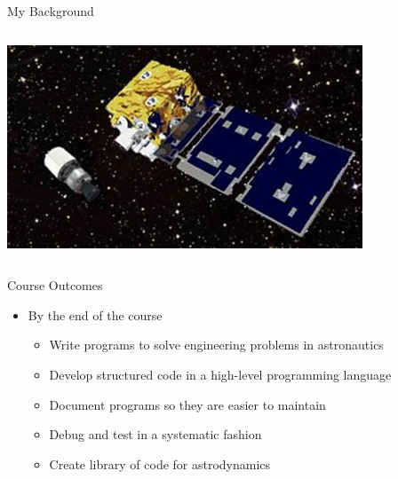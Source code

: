 \documentclass[11pt,professionalfonts]{beamer}
\begin{document}
\begin{frame}{My Background}
\begin{columns}
\begin{column}{0.5\textwidth}
            \includegraphics[width=\textwidth, height=0.3\textheight, keepaspectratio]{figures/angels__2.jpg}
        \end{column}
    \end{columns}
\end{frame}

\begin{frame}{Course Outcomes}
    \begin{itemize}
        \item By the end of the course
            \begin{itemize}
                \item Write programs to solve engineering problems in astronautics
                \item Develop structured code in a high-level programming language
                \item Document programs so they are easier to maintain
                \item Debug and test in a systematic fashion
                \item Create library of code for astrodynamics
            \end{itemize}
    \end{itemize}
\end{frame}
\end{document}
